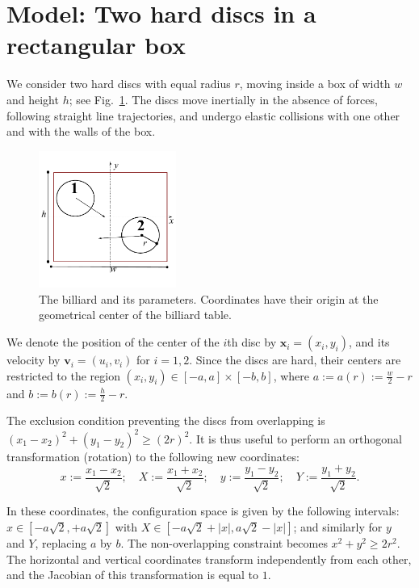 \documentclass[superscriptaddress,pre,reprint,showpacs,twocolumn]{revtex4-1}
\newcommand{\defeq}{:=}
\begin{document}
\section{Model: Two hard discs in a rectangular box}

We consider two hard discs with equal radius $r$,
moving inside a box of width $w$ and height $h$; see Fig.~\ref{billar01}. 
The discs move inertially in the absence of forces, 
following straight line trajectories,
and undergo elastic collisions with one 
other and with the walls of the box.

\begin{figure}[h]
  \begin{center}
    \includegraphics[width=0.40\textwidth]{figures/DiscsBox01.pdf}
  \end{center}
  \caption{The billiard and its parameters. Coordinates
    have their origin at the geometrical center of the 
    billiard table.}\label{billar01}
\end{figure}


We denote the position of the center of the $i$th disc by 
$\mathbf{x}_i = (x_i, y_i)$, and its velocity by $\mathbf{v}_i = (u_i, v_i)$ for $i=1,2$. Since the discs are hard, 
their centers are restricted to the region 
$(x_i, y_i) \in [-a,a] \times [-b, b]$, where 
$a \defeq a(r) \defeq \frac{w}{2} - r $ and
$b \defeq b(r) \defeq \frac{h}{2} - r $.

The exclusion condition preventing the discs from overlapping is $(x_1-x_2)^2 + (y_1-y_2)^2 \ge (2r)^2$.
It is thus useful to perform an orthogonal transformation (rotation) to the following new coordinates:
\begin{equation}\label{cambiocoor01}
 x \defeq \frac{x_1 - x_2}{\sqrt{2}}; 
\quad X \defeq \frac{x_1 + x_2}{\sqrt{2}}; 
\quad y \defeq \frac{y_1 - y_2}{\sqrt{2}}; 
\quad Y \defeq \frac{y_1 + y_2}{\sqrt{2}}.
\end{equation}

In these coordinates, the configuration space is given by the following
intervals:
$x \in [-a \sqrt{2}, +a \sqrt{2}]$ with 
$X \in [-a \sqrt{2} + |x|, a \sqrt{2} - |x|]$; and similarly for $y$ and $Y$, replacing $a$ by $b$.
The non-overlapping constraint becomes $x^2 + y^2 \ge 2 r^2$.
The horizontal and vertical coordinates transform independently
from each other, and the Jacobian of this transformation is  equal to $1$.
\end{document}
